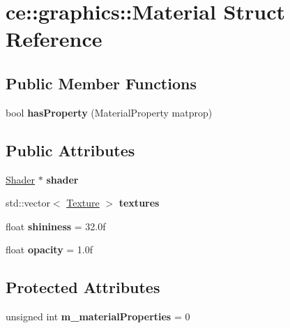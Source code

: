 \hypertarget{structce_1_1graphics_1_1_material}{}\section{ce\+:\+:graphics\+:\+:Material Struct Reference}
\label{structce_1_1graphics_1_1_material}
\subsection*{Public Member Functions}
\begin{DoxyCompactItemize}
\item 
\mbox{\label{structce_1_1graphics_1_1_material_af33c976594ddcca02b16b7fbf64d429a}} 
bool {\bfseries has\+Property} (Material\+Property matprop)
\end{DoxyCompactItemize}
\subsection*{Public Attributes}
\begin{DoxyCompactItemize}
\item 
\mbox{\label{structce_1_1graphics_1_1_material_a3451761d37b0d7e42a0bd075b163aa8e}} 
\hyperlink{classce_1_1graphics_1_1_shader}{Shader} $\ast$ {\bfseries shader}
\item 
\mbox{\label{structce_1_1graphics_1_1_material_ad14fc2a8d3a7d9241226471f8f2e2fcc}} 
std\+::vector$<$ \hyperlink{structce_1_1graphics_1_1_texture}{Texture} $>$ {\bfseries textures}
\item 
\mbox{\label{structce_1_1graphics_1_1_material_a62ed7d4af263dbdd7065a9b664bfab6e}} 
float {\bfseries shininess} = 32.\+0f
\item 
\mbox{\label{structce_1_1graphics_1_1_material_ad6f3a5c250e374b47ca6bbefb75b8a6c}} 
float {\bfseries opacity} = 1.\+0f
\end{DoxyCompactItemize}
\subsection*{Protected Attributes}
\begin{DoxyCompactItemize}
\item 
\mbox{\label{structce_1_1graphics_1_1_material_aff162e4070b34139c00cc149c70eb5f8}} 
unsigned int {\bfseries m\+\_\+material\+Properties} = 0
\end{DoxyCompactItemize}
